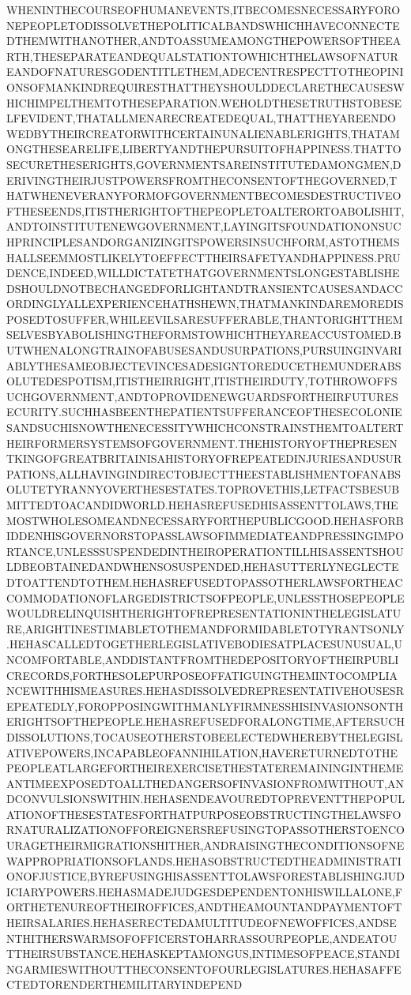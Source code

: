 \documentclass[letterpaper]{article}
\begin{document}
    WHENINTHECOURSEOFHUMANEVENTS,ITBECOMESNECESSARYFORONEPEOPLETODISSOLVETHEPOLITICALBANDSWHICHHAVECONNECTEDTHEMWITHANOTHER,ANDTOASSUMEAMONGTHEPOWERSOFTHEEARTH,THESEPARATEANDEQUALSTATIONTOWHICHTHELAWSOFNATUREANDOFNATURESGODENTITLETHEM,ADECENTRESPECTTOTHEOPINIONSOFMANKINDREQUIRESTHATTHEYSHOULDDECLARETHECAUSESWHICHIMPELTHEMTOTHESEPARATION.WEHOLDTHESETRUTHSTOBESELFEVIDENT,THATALLMENARECREATEDEQUAL,THATTHEYAREENDOWEDBYTHEIRCREATORWITHCERTAINUNALIENABLERIGHTS,THATAMONGTHESEARELIFE,LIBERTYANDTHEPURSUITOFHAPPINESS.THATTOSECURETHESERIGHTS,GOVERNMENTSAREINSTITUTEDAMONGMEN,DERIVINGTHEIRJUSTPOWERSFROMTHECONSENTOFTHEGOVERNED,THATWHENEVERANYFORMOFGOVERNMENTBECOMESDESTRUCTIVEOFTHESEENDS,ITISTHERIGHTOFTHEPEOPLETOALTERORTOABOLISHIT,ANDTOINSTITUTENEWGOVERNMENT,LAYINGITSFOUNDATIONONSUCHPRINCIPLESANDORGANIZINGITSPOWERSINSUCHFORM,ASTOTHEMSHALLSEEMMOSTLIKELYTOEFFECTTHEIRSAFETYANDHAPPINESS.PRUDENCE,INDEED,WILLDICTATETHATGOVERNMENTSLONGESTABLISHEDSHOULDNOTBECHANGEDFORLIGHTANDTRANSIENTCAUSESANDACCORDINGLYALLEXPERIENCEHATHSHEWN,THATMANKINDAREMOREDISPOSEDTOSUFFER,WHILEEVILSARESUFFERABLE,THANTORIGHTTHEMSELVESBYABOLISHINGTHEFORMSTOWHICHTHEYAREACCUSTOMED.BUTWHENALONGTRAINOFABUSESANDUSURPATIONS,PURSUINGINVARIABLYTHESAMEOBJECTEVINCESADESIGNTOREDUCETHEMUNDERABSOLUTEDESPOTISM,ITISTHEIRRIGHT,ITISTHEIRDUTY,TOTHROWOFFSUCHGOVERNMENT,ANDTOPROVIDENEWGUARDSFORTHEIRFUTURESECURITY.SUCHHASBEENTHEPATIENTSUFFERANCEOFTHESECOLONIESANDSUCHISNOWTHENECESSITYWHICHCONSTRAINSTHEMTOALTERTHEIRFORMERSYSTEMSOFGOVERNMENT.THEHISTORYOFTHEPRESENTKINGOFGREATBRITAINISAHISTORYOFREPEATEDINJURIESANDUSURPATIONS,ALLHAVINGINDIRECTOBJECTTHEESTABLISHMENTOFANABSOLUTETYRANNYOVERTHESESTATES.TOPROVETHIS,LETFACTSBESUBMITTEDTOACANDIDWORLD.HEHASREFUSEDHISASSENTTOLAWS,THEMOSTWHOLESOMEANDNECESSARYFORTHEPUBLICGOOD.HEHASFORBIDDENHISGOVERNORSTOPASSLAWSOFIMMEDIATEANDPRESSINGIMPORTANCE,UNLESSSUSPENDEDINTHEIROPERATIONTILLHISASSENTSHOULDBEOBTAINEDANDWHENSOSUSPENDED,HEHASUTTERLYNEGLECTEDTOATTENDTOTHEM.HEHASREFUSEDTOPASSOTHERLAWSFORTHEACCOMMODATIONOFLARGEDISTRICTSOFPEOPLE,UNLESSTHOSEPEOPLEWOULDRELINQUISHTHERIGHTOFREPRESENTATIONINTHELEGISLATURE,ARIGHTINESTIMABLETOTHEMANDFORMIDABLETOTYRANTSONLY.HEHASCALLEDTOGETHERLEGISLATIVEBODIESATPLACESUNUSUAL,UNCOMFORTABLE,ANDDISTANTFROMTHEDEPOSITORYOFTHEIRPUBLICRECORDS,FORTHESOLEPURPOSEOFFATIGUINGTHEMINTOCOMPLIANCEWITHHISMEASURES.HEHASDISSOLVEDREPRESENTATIVEHOUSESREPEATEDLY,FOROPPOSINGWITHMANLYFIRMNESSHISINVASIONSONTHERIGHTSOFTHEPEOPLE.HEHASREFUSEDFORALONGTIME,AFTERSUCHDISSOLUTIONS,TOCAUSEOTHERSTOBEELECTEDWHEREBYTHELEGISLATIVEPOWERS,INCAPABLEOFANNIHILATION,HAVERETURNEDTOTHEPEOPLEATLARGEFORTHEIREXERCISETHESTATEREMAININGINTHEMEANTIMEEXPOSEDTOALLTHEDANGERSOFINVASIONFROMWITHOUT,ANDCONVULSIONSWITHIN.HEHASENDEAVOUREDTOPREVENTTHEPOPULATIONOFTHESESTATESFORTHATPURPOSEOBSTRUCTINGTHELAWSFORNATURALIZATIONOFFOREIGNERSREFUSINGTOPASSOTHERSTOENCOURAGETHEIRMIGRATIONSHITHER,ANDRAISINGTHECONDITIONSOFNEWAPPROPRIATIONSOFLANDS.HEHASOBSTRUCTEDTHEADMINISTRATIONOFJUSTICE,BYREFUSINGHISASSENTTOLAWSFORESTABLISHINGJUDICIARYPOWERS.HEHASMADEJUDGESDEPENDENTONHISWILLALONE,FORTHETENUREOFTHEIROFFICES,ANDTHEAMOUNTANDPAYMENTOFTHEIRSALARIES.HEHASERECTEDAMULTITUDEOFNEWOFFICES,ANDSENTHITHERSWARMSOFOFFICERSTOHARRASSOURPEOPLE,ANDEATOUTTHEIRSUBSTANCE.HEHASKEPTAMONGUS,INTIMESOFPEACE,STANDINGARMIESWITHOUTTHECONSENTOFOURLEGISLATURES.HEHASAFFECTEDTORENDERTHEMILITARYINDEPEND
\end{document}
